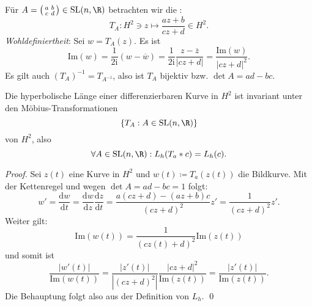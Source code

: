 \begin{definition}
  Für \( A = \left( \begin{smallmatrix}
    a & b \\ c & d
  \end{smallmatrix} \right) \in \text{SL}(n,\R) \) betrachten wir die :
  \begin{equation*}
    T_A: H^2 \ni z \mapsto \frac{az + b}{cz + d} \in H^2\text{.}
  \end{equation*}
  \emph{Wohldefiniertheit}: Sei \( w = T_A(z) \). Es ist
  \begin{equation*}
    \text{Im}(w) = \frac{1}{2\text{i}}(w-\overline{w}) = \frac{1}{2\text{i}} \frac{z - \overline{z}}{\left\vert cz + d \right\vert} = \frac{\text{Im}(w)}{\left\vert cz + d \right\vert^2}\text{.}
  \end{equation*}
  Es gilt auch \( (T_A)^{-1} = T_{A^{-1}} \), also ist \( T_A \) bijektiv bzw. \( \det A = ad - bc \).
\end{definition}

\begin{lemma}
  Die hyperbolische Länge einer differenzierbaren Kurve in \( H^2 \) ist invariant unter den Möbius-Transformationen
  \begin{equation*}
    \left \{ T_A : A \in \text{SL}(n,\R) \right \}
  \end{equation*}
  von \( H^2 \), also
  \begin{equation*}
    \forall A \in \text{SL}(n,\R) : L_h(T_a * c) = L_h(c)\text{.}
  \end{equation*}
  \begin{proof}
    Sei \( z(t) \) eine Kurve in \( H^2 \) und \( w(t) \coloneqq T_a(z(t)) \) die Bildkurve. Mit der Kettenregel und wegen \( \det A = ad - bc = 1 \) folgt:
    \begin{equation*}
      w' = \frac{\text{d}w}{\text{d}t} = \frac{\text{d}w}{\text{d}z} \frac{\text{d}z}{\text{d}t} = \frac{a(cz + d) - (az + b)c}{(cz + d)^2}z' = \frac{1}{(cz + d)^2}z' \text{.}
    \end{equation*}
    Weiter gilt:
    \begin{equation*}
      \text{Im}(w(t)) = \frac{1}{(cz(t) + d)^2}\text{Im}(z(t))
    \end{equation*}
    und somit ist
    \begin{equation*}
      \frac{\left\vert w'(t) \right\vert}{\text{Im}(w(t))} = \frac{\left\vert z'(t) \right\vert}{\left\vert (cz + d)^2 \right\vert} \frac{\left\vert cz + d \right\vert^2}{\text{Im}(z(t))} = \frac{\left\vert z'(t) \right\vert}{\text{Im}(z(t))}\text{.}
    \end{equation*}
    Die Behauptung folgt also aus der Definition von \( L_h \). \qed
  \end{proof}
\end{lemma}

